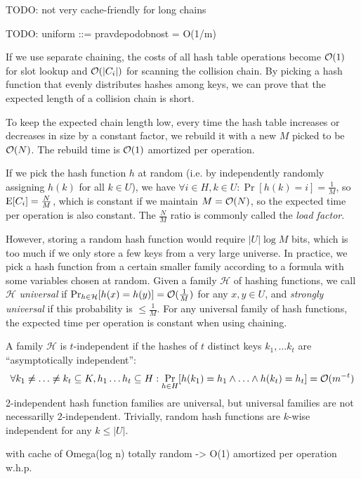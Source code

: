 TODO: not very cache-friendly for long chains

TODO: uniform ::= pravdepodobnost = O(1/m)

If we use separate chaining, the costs of all hash table operations become
$\mathcal{O}(1)$ for slot lookup and $\mathcal{O}(|C_i|)$ for scanning the collision chain.
By picking a hash function that evenly distributes hashes among keys,
we can prove that the expected length of a collision chain is short.

To keep the expected chain length low, every time the hash table increases
or decreases in size by a constant factor, we rebuild it with a new $M$
picked to be $\mathcal{O}(N)$. The rebuild time is $\mathcal{O}(1)$ amortized per operation.

If we pick the hash function $h$ at random (i.e. by independently randomly
assigning $h(k)$ for all $k\in U$), we have $\forall i\in H, k\in U:
\Pr[h(k)=i]=\frac{1}{M}$, so $\mathrm{E}[C_i]=\frac{N}{M}$, which is constant if we
maintain $M=\mathcal{O}(N)$, so the expected time per operation is also constant.
The $\frac{N}{M}$ ratio is commonly called the \emph{load factor}.

However, storing a random hash function would require $|U| \log M$ bits, which
is too much if we only store a few keys from a very large universe. In practice,
we pick a hash function from a certain smaller family according to a formula
with some variables chosen at random.
Given a family $\mathcal{H}$ of hashing functions, we call $\mathcal{H}$
\emph{universal} if $\Pr_{h\in \mathcal{H}}[h(x)=h(y)]=\mathcal{O}(\frac{1}{M})$ for any
$x, y\in U$, and \emph{strongly universal} if this probability is
$\leq\frac{1}{M}$. %
For any universal family of hash functions, the expected time per operation
is constant when using chaining.

A family $\mathcal{H}$ is $t$-independent if the hashes of $t$ distinct keys
$k_1,\ldots k_t$ are ``asymptotically independent'':
$$\forall k_1\neq\ldots \neq k_t\subseteq K,
	h_1\ldots h_t\subseteq H: \Pr_{h\in H}[h(k_1)=h_1\wedge \ldots \wedge
	h(k_t)=h_t]=\mathcal{O}(m^{-t})$$
2-independent hash function families are universal, but universal families
are not necessarilly 2-independent.
Trivially, random hash functions are $k$-wise independent for any $k\leq |U|$.

with cache of Omega(log n) totally random -> O(1) amortized per operation w.h.p.


